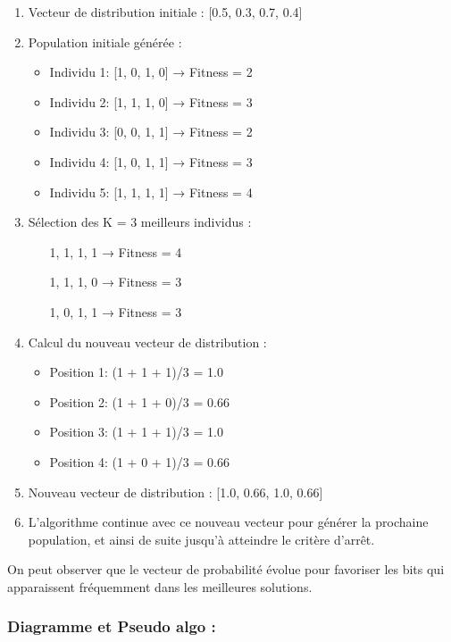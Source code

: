 \documentclass{article}
\begin{document}
\begin{enumerate}
\item Vecteur de distribution initiale : [0.5, 0.3, 0.7, 0.4]

\item Population initiale générée :
    \begin{itemize}
    \item Individu 1: [1, 0, 1, 0] → Fitness = 2
    \item Individu 2: [1, 1, 1, 0] → Fitness = 3
    \item Individu 3: [0, 0, 1, 1] → Fitness = 2
    \item Individu 4: [1, 0, 1, 1] → Fitness = 3
    \item Individu 5: [1, 1, 1, 1] → Fitness = 4
    \end{itemize}

\item Sélection des K = 3 meilleurs individus :
    \begin{itemize}
    \item [1, 1, 1, 1] → Fitness = 4
    \item [1, 1, 1, 0] → Fitness = 3
    \item [1, 0, 1, 1] → Fitness = 3
    \end{itemize}

\item Calcul du nouveau vecteur de distribution :
    \begin{itemize}
    \item Position 1: (1 + 1 + 1)/3 = 1.0
    \item Position 2: (1 + 1 + 0)/3 = 0.66
    \item Position 3: (1 + 1 + 1)/3 = 1.0
    \item Position 4: (1 + 0 + 1)/3 = 0.66
    \end{itemize}

\item Nouveau vecteur de distribution : [1.0, 0.66, 1.0, 0.66]

\item L'algorithme continue avec ce nouveau vecteur pour générer la prochaine population, et ainsi de suite jusqu'à atteindre le critère d'arrêt.
\end{enumerate}
On peut observer que le vecteur de probabilité évolue pour favoriser les bits qui apparaissent fréquemment dans les meilleures solutions.

\subsubsection{Diagramme et Pseudo algo :}
\end{document}

